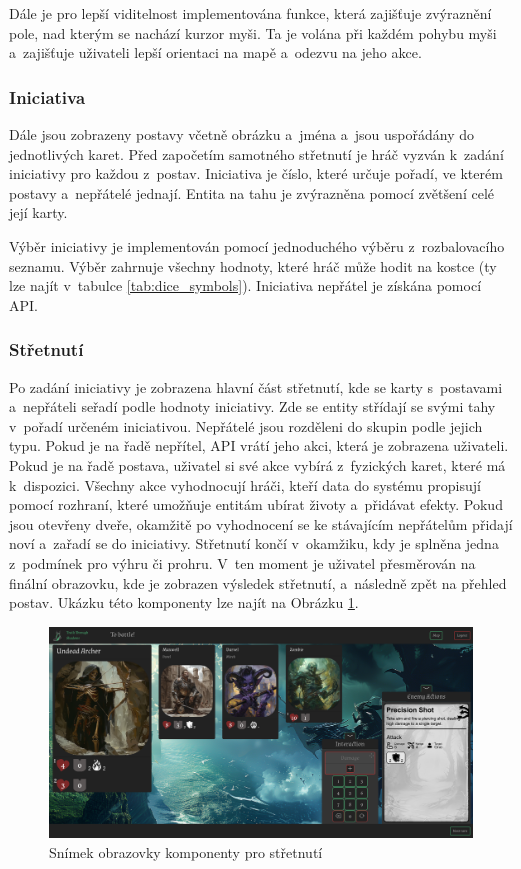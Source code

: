 Dále je pro lepší viditelnost implementována funkce, která zajišťuje zvýraznění pole, nad kterým se nachází kurzor myši. Ta je volána při každém pohybu myši a~zajišťuje uživateli lepší orientaci na mapě a~odezvu na jeho akce.

\subsubsection*{Iniciativa}
Dále jsou zobrazeny postavy včetně obrázku a~jména a~jsou uspořádány do jednotlivých karet. Před započetím samotného střetnutí je hráč vyzván k~zadání iniciativy pro každou z~postav. Iniciativa je číslo, které určuje pořadí, ve kterém postavy a~nepřátelé jednají. Entita na tahu je zvýrazněna pomocí zvětšení celé její karty.

Výběr iniciativy je implementován pomocí jednoduchého výběru z~rozbalovacího seznamu. Výběr zahrnuje všechny hodnoty, které hráč může hodit na kostce (ty lze najít v~tabulce \ref{tab:dice_symbols}). Iniciativa nepřátel je získána pomocí API.

\subsubsection*{Střetnutí}
Po zadání iniciativy je zobrazena hlavní část střetnutí, kde se karty s~postavami a~nepřáteli seřadí podle hodnoty iniciativy. Zde se entity střídají se svými tahy v~pořadí určeném iniciativou. Nepřátelé jsou rozděleni do skupin podle jejich typu. Pokud je na řadě nepřítel, API vrátí jeho akci, která je zobrazena uživateli. Pokud je na řadě postava, uživatel si své akce vybírá z~fyzických karet, které má k~dispozici. Všechny akce vyhodnocují hráči, kteří data do systému propisují pomocí rozhraní, které umožňuje entitám ubírat životy a~přidávat efekty. Pokud jsou otevřeny dveře, okamžitě po vyhodnocení se ke stávajícím nepřátelům přidají noví a~zařadí se do iniciativy. Střetnutí končí v~okamžiku, kdy je splněna jedna z~podmínek pro výhru či prohru. V~ten moment je uživatel přesměrován na finální obrazovku, kde je zobrazen výsledek střetnutí, a~následně zpět na přehled postav. Ukázku této komponenty lze najít na Obrázku \ref{fig:combat}.

\begin{figure}[H]
  \centering
  \includegraphics[width=\textwidth]{resources/figures/TTS-Encounter.png}
  \caption{Snímek obrazovky komponenty pro střetnutí}
  \label{fig:combat}
\end{figure}

